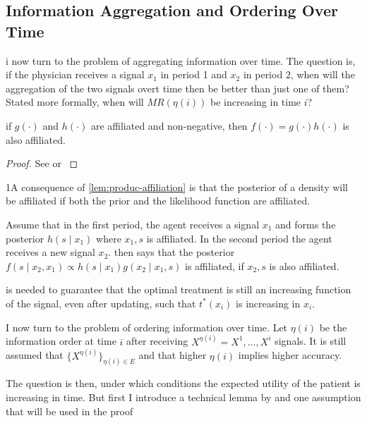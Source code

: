 \subsection{Information Aggregation and Ordering Over Time}
i now turn to the problem of aggregating information over time. The question is, if the physician receives a signal $x_1$ in period 1 and $x_2$ in period 2, when will the aggregation of the two signals overt time then be better than just one of them? Stated more formally, when will $MR(\eta(i))$ be increasing in time $i$?

\begin{lemma}\label{lem:produc-affiliation}
	if $g(\cdot)$ and $h(\cdot)$ are affiliated and non-negative, then $f(\cdot)=g(\cdot)h(\cdot)$ is also affiliated.
\end{lemma}
\begin{proof}
	See \textcite{Milgrom1982Theory} or \textcite[Collary 2.6.3]{Topkis1998Supermodularity}
\end{proof}
1A consequence of \cref{lem:produc-affiliation} is that the posterior of a density will be affiliated if both the prior and the likelihood function are affiliated.

\begin{example}
 Assume that in the first period, the agent receives a signal $x_1$ and forms the posterior $h(s\mid x_1)$ where $x_1,s$ is affiliated. In the second period the agent receives a new signal $x_2$.  then says that the posterior $f(s\mid x_2,x_1) \propto h(s\mid x_1)g(x_2\mid x_1,s)$ is affiliated, if $x_2,s$ is also affiliated.
 \end{example}

 is needed to guarantee that the optimal treatment is still an increasing function of the signal, even after updating, such that $t^*(x_i)$ is increasing in $x_i$.

I now turn to the problem of ordering information over time. Let $\eta(i)$ be the information order at time $i$ after receiving ${X}^{\eta(i)}=X^{1},\ldots,X^{i}$ signals. It is still assumed that $\{{X}^{\eta(i)}\}_{\eta(i)\in E}$ and that higher $\eta(i)$ implies higher accuracy.

The question is then, under which conditions the expected utility of the patient is increasing in time. But first I introduce a technical lemma by \textcite{Persico1996Information} and one assumption that will be used in the proof


